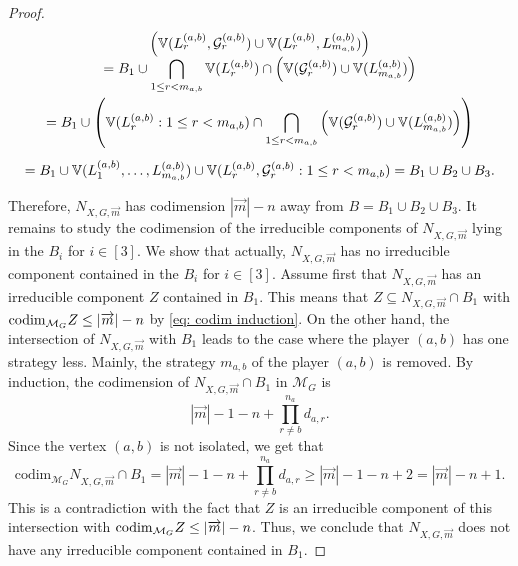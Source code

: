 \documentclass[11pt]{amsart}
\numberwithin{equation}{section}
\theoremstyle{plain}
\numberwithin{theorem}{section}
\theoremstyle{definition}
\def\codim{{\rm codim}}
\begin{document}
\begin{proof}
\[\begin{array}{c}
\left(
\mathbb{V}(L_r^{(a,b)},\mathcal G_r^{(a,b)})\cup\mathbb{V}(L_r^{(a,b)},L_{m_{a,b}}^{(a,b)})
\right) \\ 
\vspace*{1mm}\displaystyle  =B_1\cup \bigcap_{1\leq r<m_{a,b}} 
\mathbb{V}(L_r^{(a,b)})\cap\left(
\mathbb{V}(\mathcal G_r^{(a,b)})\cup\mathbb{V}(L_{m_{a,b}}^{(a,b)})
\right) \\ 
\vspace*{3mm}=\displaystyle  B_1\cup \left(\mathbb{V}(L_r^{(a,b)}:1 \leq r<m_{a,b})\cap\bigcap_{1\leq r<m_{a,b}} 
\left(
\mathbb{V}(\mathcal G_r^{(a,b)})\cup\mathbb{V}(L_{m_{a,b}}^{(a,b)})
\right) \right) \\ 
= \displaystyle  B_1\cup \mathbb{V}(L_1^{(a,b)},\ldots,L_{m_{a,b}}^{(a,b)})\cup\mathbb{V}(L_r^{(a,b)},\mathcal G_r^{(a,b)}:1\leq r<m_{a,b})=B_1\cup B_2\cup B_3
.
\end{array}
\]

Therefore, $N_{X,G,\overrightarrow{m}}$ has codimension $|\overrightarrow{m}|-n$  away from $B=B_1\cup B_2\cup B_3$. It remains to study the codimension of the irreducible components of $N_{X,G,\overrightarrow{m}}$ lying in the $B_i$ for $i\in[3]$. We show that actually, $N_{X,G,\overrightarrow{m}}$ has no irreducible component contained in the $B_i$ for $i\in[3]$.
Assume first that $N_{X,G,\overrightarrow{m}}$ has an irreducible component $Z$ contained in $B_1$. This means that $Z\subseteq N_{X,G,\overrightarrow{m}}\cap B_1$ with $\codim_{\mathcal{M}_G}Z\leq |\overrightarrow{m}|-n$ by \eqref{eq: codim induction}. On the other hand,
the intersection of $N_{X,G,\overrightarrow{m}}$ with $B_1$ leads to the case where the player $(a,b)$ has one strategy less. Mainly, the strategy $m_{a,b}$ of the player $(a,b)$ is removed. 
By induction, the codimension of $ N_{X,G,\overrightarrow{m}}\cap B_1$ in $\mathcal{M}_G$ is 
\[
|\overrightarrow{m}|-1-n+\prod_{r\neq b}^{n_a}d_{a,r}.
\]
Since the vertex $(a,b)$ is not isolated, we get that 
\[
\mathrm{codim}_{\mathcal{M}_G}  N_{X,G,\overrightarrow{m}}\cap B_1=|\overrightarrow{m}|-1-n+\prod_{r\neq b}^{n_a}d_{a,r}\geq |\overrightarrow{m}|-1-n +2=|\overrightarrow{m}|-n+1.
\]
This is a contradiction with the fact that $Z$ is an irreducible component of this intersection with $\codim_{\mathcal{M}_G}Z\leq |\overrightarrow{m}|-n$. Thus, we conclude that $N_{X,G,\overrightarrow{m}}$ does not have any irreducible component contained in $B_1$.



\end{proof}
\end{document}
